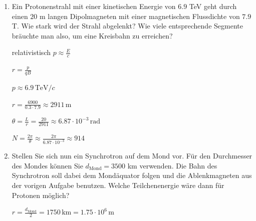 \documentclass[11pt,a4paper]{scrartcl}
\begin{document}
\begin{enumerate}[label=(\alph*)]
\begin{calculationbox}
        $\gamma = 1 + \frac{E_{kin}}{m_p\cdot c^2}$, $\beta = \sqrt{1 - \frac{1}{\gamma}}$

        $m_p\cdot c^2 \approx 938.272$ MeV
    \end{calculationbox}
    \begin{enumerate}[label=(\roman*)]
        \item $9$ MeV
        \begin{calculationbox}
            $\gamma \approx 1.0096$

            $\beta \approx 0.1375$

            $l = \frac{0.13752\cdot c}{2 \cdot 222 \cdot 10^6\text{ Hz}} \approx 0.0928$ m
        \end{calculationbox}
        \item $9$ GeV
        \begin{calculationbox}
            $\gamma \approx 10.5949$

            $\beta \approx 0.995536$

            $l = \frac{0.995536\cdot c}{2 \cdot 222 \cdot 10^9\text{ Hz}} \approx 0.672194$ m
        \end{calculationbox}
    \end{enumerate}
    erreicht haben.
    \item Ein Protonenstrahl mit einer kinetischen Energie von $6.9$ TeV geht durch einen $20$ m langen Dipolmagneten mit einer magnetischen Flussdichte von $7.9$ T. Wie stark wird der Strahl abgelenkt? Wie viele entsprechende Segmente bräuchte man also, um eine Kreisbahn zu erreichen?
    \begin{calculationbox}


        relativistisch $p \approx \frac{E}{c}$

        $r = \frac{p}{qB}$

        $p \approx 6.9\,\text{TeV}/c$

        $r = \frac{6900}{0.3 \cdot 7.9} \approx 2911\,\text{m}$

        $\theta = \frac{L}{r} = \frac{20}{2911} \approx 6.87 \cdot 10^{-3}\,\text{rad}$

        $N = \frac{2\pi}{\theta} \approx \frac{2\pi}{6.87 \cdot 10^{-3}} \approx 914$

    \end{calculationbox}
    \item Stellen Sie sich nun ein Synchrotron auf dem Mond vor. Für den Durchmesser des Mondes können Sie $d_{\text{Mond}} = 3500$ km verwenden. Die Bahn des Synchrotron soll dabei dem Mondäquator folgen und die Ablenkmagneten aus der vorigen Aufgabe benutzen. Welche Teilchenenergie wäre dann für Protonen möglich?
    \begin{calculationbox}
        $r = \frac{d_{\text{Mond}}}{2} = 1750\,\text{km} = 1.75 \cdot 10^6\,\text{m}$


\end{calculationbox}
\end{enumerate}
\end{document}
